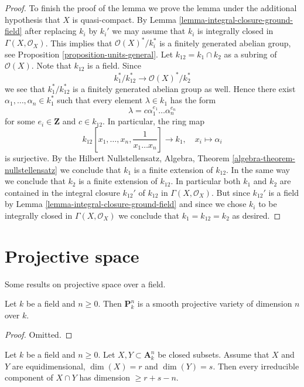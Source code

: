 \begin{proof}
\medskip\noindent
To finish the proof of the lemma we prove the lemma under the
additional hypothesis that $X$ is quasi-compact. By
Lemma \ref{lemma-integral-closure-ground-field}
after replacing $k_i$ by $k_i'$
we may assume that $k_i$ is integrally closed in $\Gamma(X, \mathcal{O}_X)$.
This implies that $\mathcal{O}(X)^*/k_i^*$ is a finitely generated
abelian group, see
Proposition \ref{proposition-units-general}.
Let $k_{12} = k_1 \cap k_2$ as a subring of $\mathcal{O}(X)$.
Note that $k_{12}$ is a field. Since
$$
k_1^*/k_{12}^* \longrightarrow \mathcal{O}(X)^*/k_2^*
$$
we see that $k_1^*/k_{12}^*$ is a finitely generated abelian group as well.
Hence there exist $\alpha_1, \ldots, \alpha_n \in k_1^*$ such that
every element $\lambda \in k_1$ has the form
$$
\lambda = c \alpha_1^{e_1} \ldots \alpha_n^{e_n}
$$
for some $e_i \in \mathbf{Z}$ and $c \in k_{12}$.
In particular, the ring map
$$
k_{12}[x_1, \ldots, x_n, \frac{1}{x_1 \ldots x_n}] \longrightarrow k_1, \quad
x_i \longmapsto \alpha_i
$$
is surjective. By the Hilbert Nullstellensatz,
Algebra, Theorem \ref{algebra-theorem-nullstellensatz}
we conclude that $k_1$ is a finite extension of $k_{12}$.
In the same way we conclude that $k_2$ is a finite extension of $k_{12}$.
In particular both $k_1$ and $k_2$ are contained in the integral closure
$k_{12}'$ of $k_{12}$ in $\Gamma(X, \mathcal{O}_X)$. But since $k_{12}'$
is a field by
Lemma \ref{lemma-integral-closure-ground-field}
and since we chose $k_i$ to be integrally closed in $\Gamma(X, \mathcal{O}_X)$
we conclude that $k_1 = k_{12} = k_2$ as desired.
\end{proof}





\section{Projective space}
\label{section-projective-space}

\noindent
Some results on projective space over a field.

\begin{lemma}
\label{lemma-projective-space-smooth}
Let $k$ be a field and $n \geq 0$. Then $\mathbf{P}^n_k$ is a
smooth projective variety of dimension $n$ over $k$.
\end{lemma}

\begin{proof}
Omitted.
\end{proof}

\begin{lemma}
\label{lemma-intersection-in-affine-space}
Let $k$ be a field and $n \geq 0$. Let $X, Y \subset \mathbf{A}^n_k$
be closed subsets. Assume that $X$ and $Y$ are equidimensional,
$\dim(X) = r$ and $\dim(Y) = s$.
Then every irreducible component of $X \cap Y$ has dimension $\geq r + s - n$.
\end{lemma}


